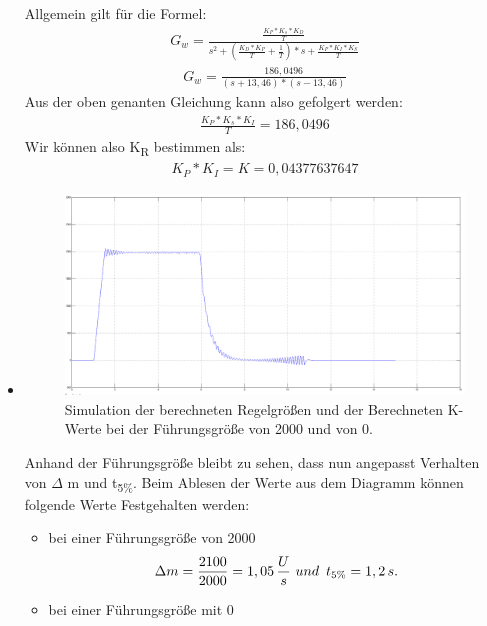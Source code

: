 \documentclass[10pt]{scrartcl}
\begin{document}
\begin{itemize}
Allgemein gilt für die Formel:
\begin{align}
G_{w} = \frac{\frac{K_P * K_s*K_D}{T}}{s^2+(\frac{K_D*K_P}{T}+\frac{1}{T})*s+\frac{K_P*K_I*K_S}{T}}
\end{align} 
\begin{align}
G_{w} = \frac{186,0496}{(s+13,46) * (s-13,46)}
\end{align} 
Aus der oben genanten Gleichung kann also gefolgert werden:
\begin{align}
\frac{K_P * K_s*K_I}{T} =186,0496
\end{align}
Wir können also K\textsubscript{R} bestimmen als:
\begin{align}
K_P * K_I = K = 0,04377637647
\end{align}
\item
\begin{figure}[H]
	\centering
	\includegraphics[width=1.2\textwidth]{Antrieb/Drehzahl7irgendwas.png}
	\caption{Simulation der berechneten Regelgrößen und der Berechneten K-Werte bei der Führungsgröße von 2000 und von 0.}
	\label{img:grafik-dummy}
\end{figure}
Anhand der Führungsgröße bleibt zu sehen, dass nun angepasst Verhalten von  $\Delta$ m und t\textsubscript{5\%}.
Beim Ablesen der Werte aus dem Diagramm können folgende Werte Festgehalten werden:
\begin{itemize}
\item bei einer Führungsgröße von 2000
\begin{align}
\Delta m = \frac{2100}{2000} = 1,05\,\frac{U}{s} \,\,und\,\,\, t\textsubscript{5\%} = 1,2\,s.
\end{align}
\item bei einer Führungsgröße mit 0
\end{itemize}

 \end{itemize}
\end{document}
